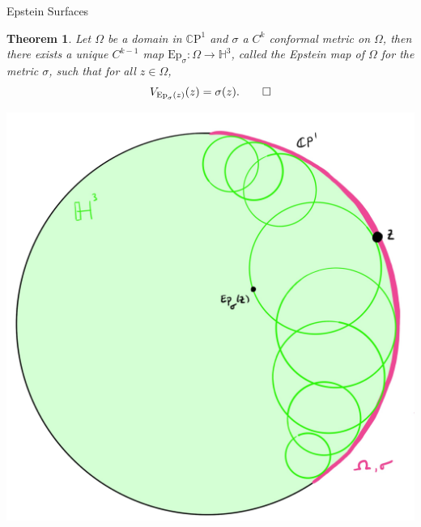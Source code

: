\documentclass[professionalfont]{beamer}
\newcommand{\CP}{\mathbb{C}\mathrm{P}}
\renewcommand{\H}{\mathbb{H}}
\newtheorem{thm}{Theorem}[section]
\begin{document}
\begin{frame}{Epstein Surfaces}


\begin{thm}
Let $\Omega$ be a domain in $\CP^1$  and $\sigma$ a $C^k$ conformal metric on $\Omega$, then there exists a unique $C^{k-1}$ map $\mathrm{Ep}_\sigma : \Omega \to \H^3$, called the Epstein map of $\Omega$ for the metric $\sigma$, such that for all $z \in \Omega$,
\[
V_{\mathrm{Ep}_\sigma(z)}(z) = \sigma(z). \qed
\]
\end{thm}


\centering\includegraphics[scale=0.07]{Epstein-3.jpg}

\end{frame}


\end{document}

